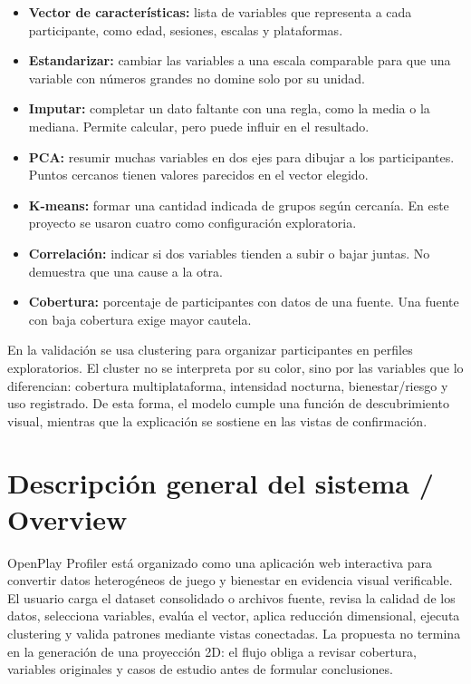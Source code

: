 \documentclass[12pt,a4paper]{article}
\begin{document}
\begin{itemize}
    \item \textbf{Vector de caracter\'isticas:} lista de variables que representa a cada participante, como edad, sesiones, escalas y plataformas.
    \item \textbf{Estandarizar:} cambiar las variables a una escala comparable para que una variable con n\'umeros grandes no domine solo por su unidad.
    \item \textbf{Imputar:} completar un dato faltante con una regla, como la media o la mediana. Permite calcular, pero puede influir en el resultado.
    \item \textbf{PCA:} resumir muchas variables en dos ejes para dibujar a los participantes. Puntos cercanos tienen valores parecidos en el vector elegido.
    \item \textbf{K-means:} formar una cantidad indicada de grupos seg\'un cercan\'ia. En este proyecto se usaron cuatro como configuraci\'on exploratoria.
    \item \textbf{Correlaci\'on:} indicar si dos variables tienden a subir o bajar juntas. No demuestra que una cause a la otra.
    \item \textbf{Cobertura:} porcentaje de participantes con datos de una fuente. Una fuente con baja cobertura exige mayor cautela.
\end{itemize}

En la validaci\'on se usa clustering para organizar participantes en perfiles exploratorios. El cluster no se interpreta por su color, sino por las variables que lo diferencian: cobertura multiplataforma, intensidad nocturna, bienestar/riesgo y uso registrado. De esta forma, el modelo cumple una funci\'on de descubrimiento visual, mientras que la explicaci\'on se sostiene en las vistas de confirmaci\'on.

\section{Descripci\'on general del sistema / Overview}

OpenPlay Profiler est\'a organizado como una aplicaci\'on web interactiva para convertir datos heterog\'eneos de juego y bienestar en evidencia visual verificable. El usuario carga el dataset consolidado o archivos fuente, revisa la calidad de los datos, selecciona variables, eval\'ua el vector, aplica reducci\'on dimensional, ejecuta clustering y valida patrones mediante vistas conectadas. La propuesta no termina en la generaci\'on de una proyecci\'on 2D: el flujo obliga a revisar cobertura, variables originales y casos de estudio antes de formular conclusiones.
\end{document}
